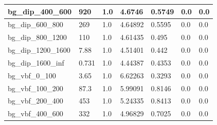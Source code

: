 \documentclass[a4paper, 10pt]{article}
\begin{document}
\begin{table}[H]
\begin{center}
\begin{tabular}{|m{23.0mm}|m{23.0mm}|m{18.0mm}|m{19.0mm}|m{19.0mm}|m{19.0mm}|m{19.0mm}|}
      \hline
      {\cellcolor{white}         bg\_dip\_400\_600}& {\cellcolor{white}         920}& {\cellcolor{white}         1.0}& {\cellcolor{white}         4.6746}& {\cellcolor{white}         0.5749}& {\cellcolor{green}         0.0}& {\cellcolor{green}         0.0}\\
      \hline
      {\cellcolor{white}         bg\_dip\_600\_800}& {\cellcolor{white}         269}& {\cellcolor{white}         1.0}& {\cellcolor{white}         4.64892}& {\cellcolor{white}         0.5595}& {\cellcolor{green}         0.0}& {\cellcolor{green}         0.0}\\
      \hline
      {\cellcolor{white}         bg\_dip\_800\_1200}& {\cellcolor{white}         110}& {\cellcolor{white}         1.0}& {\cellcolor{white}         4.61435}& {\cellcolor{white}         0.495}& {\cellcolor{green}         0.0}& {\cellcolor{green}         0.0}\\
      \hline
      {\cellcolor{white}         bg\_dip\_1200\_1600}& {\cellcolor{white}         7.88}& {\cellcolor{white}         1.0}& {\cellcolor{white}         4.51401}& {\cellcolor{white}         0.442}& {\cellcolor{green}         0.0}& {\cellcolor{green}         0.0}\\
      \hline
      {\cellcolor{white}         bg\_dip\_1600\_inf}& {\cellcolor{white}         0.731}& {\cellcolor{white}         1.0}& {\cellcolor{white}         4.44387}& {\cellcolor{white}         0.4353}& {\cellcolor{green}         0.0}& {\cellcolor{green}         0.0}\\
      \hline
      {\cellcolor{white}         bg\_vbf\_0\_100}& {\cellcolor{white}         3.65}& {\cellcolor{white}         1.0}& {\cellcolor{white}         6.62263}& {\cellcolor{white}         0.3293}& {\cellcolor{green}         0.0}& {\cellcolor{green}         0.0}\\
      \hline
      {\cellcolor{white}         bg\_vbf\_100\_200}& {\cellcolor{white}         87.3}& {\cellcolor{white}         1.0}& {\cellcolor{white}         5.99091}& {\cellcolor{white}         0.8146}& {\cellcolor{green}         0.0}& {\cellcolor{green}         0.0}\\
      \hline
      {\cellcolor{white}         bg\_vbf\_200\_400}& {\cellcolor{white}         453}& {\cellcolor{white}         1.0}& {\cellcolor{white}         5.24335}& {\cellcolor{white}         0.8413}& {\cellcolor{green}         0.0}& {\cellcolor{green}         0.0}\\
      \hline
      {\cellcolor{white}         bg\_vbf\_400\_600}& {\cellcolor{white}         332}& {\cellcolor{white}         1.0}& {\cellcolor{white}         4.96829}& {\cellcolor{white}         0.7025}& {\cellcolor{green}         0.0}& {\cellcolor{green}         0.0}\\

\end{tabular}
\end{center}
\end{table}
\end{document}
